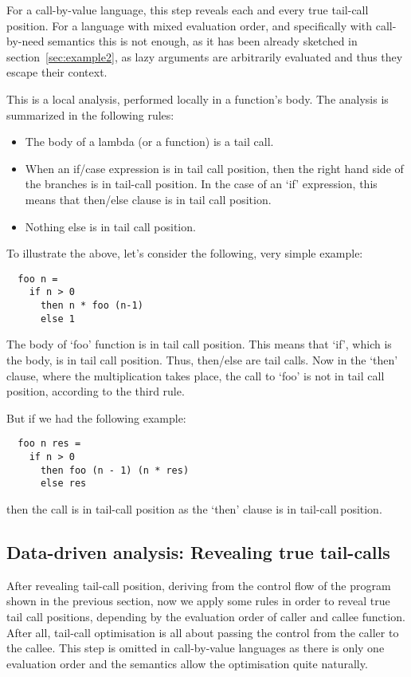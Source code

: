 \documentclass[diploma]{softlab-thesis}
\begin{document}
For a call-by-value language, this step reveals each and every true tail-call position. For a language with mixed evaluation order, and specifically 
with call-by-need semantics this is not enough, as it has been already sketched in section~\ref{sec:example2}, as lazy arguments are arbitrarily evaluated and thus 
they escape their context. 

This is a local analysis, performed locally in a function's body. The analysis is summarized in the following rules:
\begin{itemize}
  \item The body of a lambda (or a function) is a tail call.
  \item When an if/case expression is in tail call position, then the right hand side of the branches is in tail-call position. 
  In the case of an `if' expression, this means that then/else clause is in tail call position.
  \item Nothing else is in tail call position.
\end{itemize}

To illustrate the above, let's consider the following, very simple example:
\begin{verbatim}
  foo n = 
    if n > 0  
      then n * foo (n-1) 
      else 1
\end{verbatim}

The body of `foo' function is in tail call position. This means that `if', which is the body, is in tail call position. 
Thus, then/else are tail calls. Now in the `then' clause, where the multiplication takes place, the call to `foo' is not in tail call position, 
according to the third rule.

But if we had the following example:
\begin{verbatim}
  foo n res = 
    if n > 0 
      then foo (n - 1) (n * res)
      else res
\end{verbatim}
then the call is in tail-call position as the `then' clause is in tail-call position.

\subsection{Data-driven analysis: Revealing true tail-calls}
\label{sec:data-driven-analysis}

After revealing tail-call position, deriving from the control flow of the program shown in the previous section, now we apply some rules in order to 
reveal true tail call positions, depending by the evaluation order of caller and callee function. After all, tail-call optimisation 
is all about passing the control from the caller to the callee. This step is omitted in call-by-value languages as there is 
only one evaluation order and the semantics allow the optimisation quite naturally.
\end{document}
